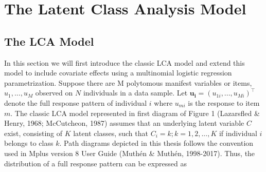 \section{The Latent Class Analysis Model}

\subsection{The LCA Model}
In this section we will first introduce the classic LCA model and extend this model to include covariate effects using a multinomial logistic regression parametrization. Suppose there are M polytomous manifest variables or items, $u_{1},...,u_{M}$ observed on $N$ individuals in a data sample. Let $\bm{u_{i}} = (u_{1i},...,u_{Mi})^{\intercal}$ denote the full response pattern of individual $i$ where $u_{mi}$ is the response to item $m$. The classic LCA model represented in first diagram of Figure 1 (Lazarsfled \& Henry, 1968; McCutcheon, 1987) assumes that an underlying latent variable $C$ exist, consisting of $K$ latent classes, such that $C_{i}=k; k=1,2,...,K$ if individual $i$ belongs to class $k$. Path diagrams depicted in this thesis follows the convention used in Mplus version 8 User Guide (Muth\'en \& Muth\'en, 1998-2017). Thus, the distribution of a full response pattern can be expressed as 


